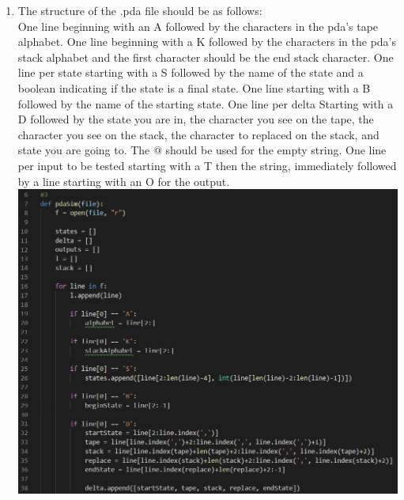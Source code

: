 \documentclass[a4paper]{article}
\begin{document}
\begin{enumerate}
    \item The structure of the .pda file should be as follows: \\
    One line beginning with an A followed by the characters in the pda's tape alphabet.
    One line beginning with a K followed by the characters in the pda's stack alphabet
    and the first character should be the end stack character. One line per state starting
    with a S followed by the name of the state and a boolean indicating if the state
    is a final state. One line starting with a B followed by the name of the starting
    state. One line per delta Starting with a D followed by the state you are in, the
    character you see on the tape, the character you see on the stack, the character 
    to replaced on the stack, and state you are going to. The @ should be used for the 
    empty string. One line per input to be tested starting with a T then the string, 
    immediately followed by a line starting with an O for the output. \\
    \includegraphics[scale=0.5]{3a} \\

\end{enumerate}
\end{document}
